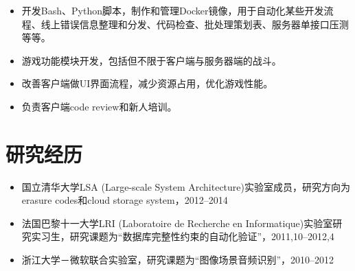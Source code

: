 \documentclass[letterpaper]{article}
\begin{document}
\begin{itemize}
\begin{itemize}
\begin{itemize}
\begin{itemize}
                        \end{itemize}
                    \item 开发Bash、Python脚本，制作和管理Docker镜像，用于自动化某些开发流程、线上错误信息整理和分发、代码检查、批处理策划表、服务器单接口压测等等。
                    \item 游戏功能模块开发，包括但不限于客户端与服务器端的战斗。
                    \item 改善客户端做UI界面流程，减少资源占用，优化游戏性能。
                    \item 负责客户端code review和新人培训。
                \end{itemize}
        \end{itemize}
\end{itemize}

\section*{研究经历}
\begin{itemize}
    \item 国立清华大学LSA (Large-scale System Architecture)实验室成员，研究方向为erasure codes和cloud storage system，2012--2014
    \item 法国巴黎十一大学LRI (Laboratoire de Recherche en Informatique)实验室研究实习生，研究课题为“数据库完整性约束的自动化验证”，2011,10--2012,4
    \item 浙江大学－微软联合实验室，研究课题为“图像场景音频识别”，2010--2012
\end{itemize}
\end{document}
